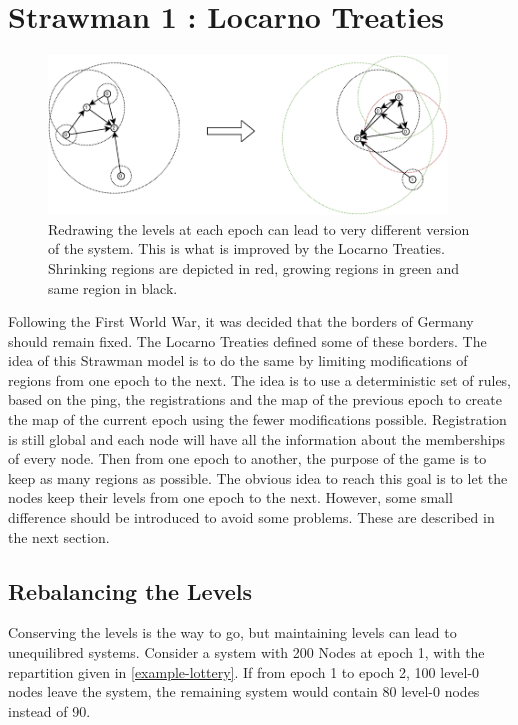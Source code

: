 \documentclass[a4paper,11pt,oneside]{report}
\begin{document}
\section{Strawman 1 : Locarno Treaties} \label{Locarno}

\begin{figure}[!h] 
\centering
\includegraphics[width=300pt]{figures/LocarnoTreaties-Redrawing}
\caption{Redrawing the levels at each epoch can lead to very different version
  of the system. This is what is improved by the Locarno Treaties. Shrinking
  regions are depicted in red, growing regions in green and same region in
  black.} \label{fig:LocarnoTreaties-Redrawing}
\end{figure}

Following the First World War, it was decided that the borders of Germany
should remain fixed. The Locarno Treaties defined some of these borders. The
idea of this Strawman model is to do the same by limiting modifications of
regions from one epoch to the next. The idea is to use a deterministic set of
rules, based on the ping, the registrations and the map of the previous epoch
to create the map of the current epoch using the fewer modifications possible.
Registration is still global and each node will have all the information about
the memberships of every node. Then from one epoch to another, the purpose of
the game is to keep as many regions as possible. The obvious idea to reach this
goal is to let the nodes keep their levels from one epoch to the next. However,
some small difference should be introduced to avoid some problems.
These are described in the next section.

\subsection{Rebalancing the Levels} \label{rebalancing}
Conserving the levels is the way to go, but maintaining levels can lead to
unequilibred systems. Consider a system with 200 Nodes at epoch 1, with the
repartition given in \autoref{example-lottery}. If from epoch 1 to epoch 2,
100 level-0 nodes leave the system, the remaining system would contain 80
level-0 nodes instead of 90. 
\end{document}
